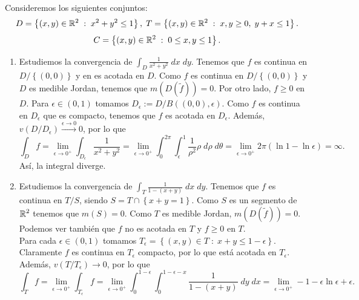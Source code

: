 \begin{eg}
Consideremos los siguientes conjuntos:
\[D = \left\{ \left(x,y\right) \in \mathbb{R}^{2} \; : \; x^{2}+y^{2}\leq 1\right\} , \; T = \left\{ \left(x,y\right)\in \mathbb{R}^{2} \; : \; x,y \geq 0, \; y + x\leq 1\right\}    .\]
\[ C = \left\{ \left(x,y\right)\in \mathbb{R}^{2} \; : \; 0\leq x,y\leq 1\right\}.\]
\begin{enumerate}
	\item Estudiemos la convergencia de $\displaystyle \int _{D}\frac{1}{x^{2}+y^{2}} \; dx \; dy $. Tenemos que $\displaystyle f $ es continua en $\displaystyle D/ \left\{ \left(0,0\right)\right\}  $ y en es acotada en $\displaystyle D $. Como $\displaystyle f $ es continua en $\displaystyle D/ \left\{ \left(0,0\right)\right\}  $ y $\displaystyle D $ es medible Jordan, tenemos que $\displaystyle m\left(D\left(\tilde{f}\right)\right)=0 $. Por otro lado, $\displaystyle f \geq 0 $ en $\displaystyle D $. 
		Para $\displaystyle \epsilon \in \left(0,1\right) $ tomamos $\displaystyle D_{\epsilon }:=D/B\left(\left(0,0\right), \epsilon \right) $. Como $\displaystyle f $ es continua en $\displaystyle D_{\epsilon } $ que es compacto, tenemos que $\displaystyle f $ es acotada en $\displaystyle D_{\epsilon } $. Además, $\displaystyle v\left(D/D_{\epsilon }\right)\xrightarrow{\epsilon \to 0}0 $, por lo que
\[\int _{D}f =\lim_{\epsilon  \to 0^{+}}\int _{D_{\epsilon }}\frac{1}{x^{2}+y^{2}} =\lim_{\epsilon  \to 0^{+}}\int^{2\pi }_{0} \int^{1}_{\epsilon } \frac{1}{\rho ^{2}}\rho \; d\rho \; d\theta = \lim_{\epsilon  \to 0^{+}}2\pi\left(\ln 1 - \ln \epsilon \right)=\infty .\]
Así, la integral diverge. 	
\item Estudiemos la convergencia de $\displaystyle \int _{T}\frac{1}{1-\left(x+y\right)} \; dx \; dy $. Tenemos que $\displaystyle f $ es continua en $\displaystyle T/ S $, siendo $\displaystyle S = T \cap \left\{ x+y = 1\right\}  $. Como $\displaystyle S $ es un segmento de $\displaystyle \mathbb{R}^{2} $ tenemos que $\displaystyle m\left(S\right)=0 $. Como $\displaystyle T $ es medible Jordan, $\displaystyle m\left(D\left(\tilde{f}\right)\right)=0 $. Podemos ver también que $\displaystyle f $ no es acotada en $\displaystyle T $ y $\displaystyle f \geq 0 $ en $\displaystyle T $. \\
	Para cada $\displaystyle \epsilon \in \left(0,1\right) $ tomamos $\displaystyle T_{\epsilon }= \left\{ \left(x,y\right)\in T \; : \; x+y \leq 1-\epsilon \right\}  $. Claramente $\displaystyle f $ es continua en $\displaystyle T_{\epsilon } $ compacto, por lo que está acotada en $\displaystyle T_{\epsilon } $. Además, $\displaystyle v\left(T/T_{\epsilon }\right)\to0 $, por lo que 
	\[\int _{T}f =\lim_{\epsilon  \to 0^{+}}\int _{T_{\epsilon }}f =\lim_{\epsilon  \to 0^{+}}\int^{1-\epsilon }_{0} \int^{1-\epsilon -x}_{0} \frac{1}{1-\left(x+y\right)} \; dy \; dx =\lim_{\epsilon  \to 0^{+}}-1-\epsilon\ln\epsilon + \epsilon.\]
\end{enumerate}
\end{eg}
